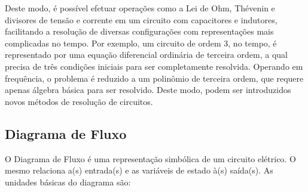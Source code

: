 \documentclass{article}
\numberwithin{equation}{section}
\begin{document}
Deste modo, é possível efetuar operações como a Lei de Ohm, Thévenin e divisores de tensão e corrente em um circuito com capacitores e indutores, facilitando a resolução de diversas configurações com representações mais complicadas no tempo. Por exemplo, um circuito de ordem 3, no tempo, é representado por uma equação diferencial ordinária de terceira ordem, a qual precisa de três condições iniciais para ser completamente resolvida. Operando em frequência, o problema é reduzido a um polinômio de terceira ordem, que requere apenas álgebra básica para ser resolvido. Deste modo, podem ser introduzidos novos métodos de resolução de circuitos.

\subsection{Diagrama de Fluxo}
\label{subsec:fluxo}
O Diagrama de Fluxo é uma representação simbólica de um circuito elétrico. O mesmo relaciona a(s) entrada(s) e as variáveis de estado à(s) saída(s). As unidades básicas do diagrama são:
\end{document}
